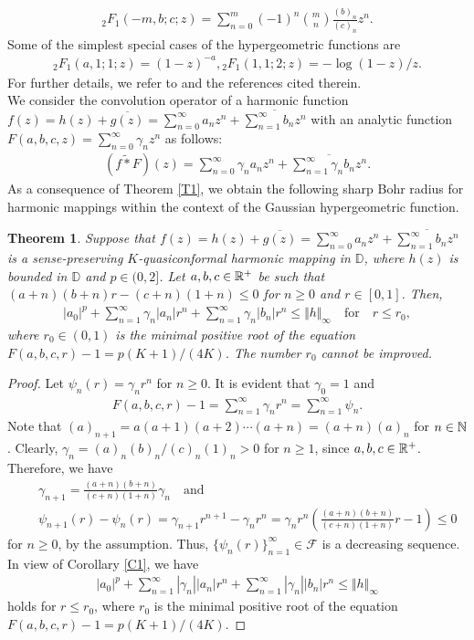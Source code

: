 \documentclass[11pt,reqno]{amsart}
\newtheorem{theo}{Theorem}[section]
\newtheorem{open problem}{Open problem}[section]
\newcommand{\F}{{\mathcal{F}}}
\newcommand{\N}{{\Bbb{N}}}
\newcommand{\R}{{\Bbb{R}}}
\newcommand{\ol}{\overline}
\newcommand{\beas}{\begin{eqnarray*}}
\newcommand{\eeas}{\end{eqnarray*}}
\numberwithin{equation}{section}
\begin{document}
\beas {}_2F_1(-m,b;c;z)=\sum_{n=0}^m (-1)^n \binom{m}{n}\frac{(b)_n}{(c)_n} z^n.\eeas
Some of the simplest special cases of the hypergeometric functions are
\beas {}_2F_1(a,1;1;z)=(1-z)^{-a}, {}_2F_1(1,1;2;z)=-\log(1-z)/z.\eeas
For further details, we refer to \cite{QV2005} and the references cited therein.\\[2mm] 
\indent We consider the convolution operator of a harmonic function $f(z)=h(z)+\ol{g(z)}=\sum_{n=0}^\infty a_n z^n+\ol{\sum_{n=1}^\infty b_n z^n}$ with an analytic function $F(a, b, c, z)=\sum_{n=0}^\infty \gamma_n z^n$ as follows:
\beas \left(f\tilde{*}F\right)(z)=\sum_{n=0}^\infty \gamma_n a_n z^n+\ol{\sum_{n=1}^\infty \gamma_n b_n z^n}.\eeas 
As a consequence of \textrm{Theorem \ref{T1}}, we obtain the following sharp Bohr radius for harmonic mappings within the context of the Gaussian hypergeometric function. 
\begin{theo} Suppose that $f(z)=h(z)+\ol{g(z)}=\sum_{n=0}^\infty a_n z^n+\ol{\sum_{n=1}^\infty b_n z^n}$ is a sense-preserving $K$-quasiconformal harmonic mapping in 
$\mathbb{D}$, where $h(z)$ is bounded in $\mathbb{D}$ and $p\in(0,2]$. Let $a, b, c\in\R^+$ be such that $(a+n)(b+n)r-(c+n)(1+n)\leq0$ for $n\geq 0$ and $r\in[0,1]$. Then,
\beas |a_0|^p+\sum_{n=1}^\infty \gamma_n|a_n|r^n+\sum_{n=1}^\infty \gamma_n|b_n|r^n\leq \Vert h\Vert_\infty \quad\text{for}\quad r\leq r_0, \eeas
where $r_0\in(0,1)$ is the minimal positive root of the equation $F(a, b, c, r)-1=p(K+1)/(4K)$. The number $r_0$ cannot be improved.
\end{theo}
\begin{proof}Let $\psi_n(r)=\gamma_n r^n$ for $n\geq 0$. It is evident that $\gamma_0=1$ and
\beas F(a, b, c, r)-1=\sum_{n=1}^\infty \gamma_n r^n=\sum_{n=1}^\infty\psi_n.\eeas
Note that $(a)_{n+1}=a(a+1)(a+2)\cdots(a+n)=(a+n)(a)_n$ for $n\in\N$. 
Clearly, $\gamma_n=(a)_n(b)_n/(c)_n(1)_n>0$ for $n\geq 1$, since $a,b,c\in\R^+$.
Therefore, we have
\beas &&\gamma_{n+1}=\frac{(a+n)(b+n)}{(c+n)(1+n)}\gamma_n\quad\text{and}\\[2mm]
&&\psi_{n+1}(r)-\psi_n(r)=\gamma_{n+1} r^{n+1}-\gamma_n r^n=\gamma_n r^n\left(\frac{(a+n)(b+n)}{(c+n)(1+n)}r-1\right)\leq 0\eeas
for $n\geq 0$, by the assumption. Thus, $\{\psi_n(r)\}_{n=1}^\infty\in\F$ is a decreasing sequence. In view of \textrm{Corollary \ref{C1}}, we have
\beas |a_0|^p+\sum_{n=1}^\infty |\gamma_n||a_n|r^n+\sum_{n=1}^\infty |\gamma_n||b_n|r^n\leq \Vert h\Vert_\infty\eeas
 holds for $r\leq r_0$, where $r_0$ is the minimal positive root of the equation $F(a, b, c, r)-1=p(K+1)/(4K)$.
\end{proof}
\end{document}

